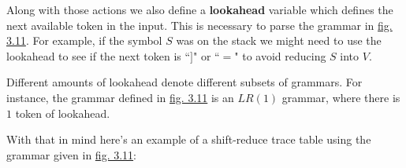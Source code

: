 Along with those actions we also define a \textbf{lookahead} variable which defines the next available token in the input. This is necessary to parse the grammar in \hyperref[fig:3.11]{fig. 3.11}. For example, if the symbol $S$ was on the stack we might need to use the lookahead to see if the next token is ``$]$" or ``$=$" to avoid reducing $S$ into $V$.\textsuperscript{\cite{johnson_zelenski_2007}\cite{knuth_1965}}

Different amounts of lookahead denote different subsets of grammars. For instance, the grammar defined in \hyperref[fig:3.11]{fig. 3.11} is an $LR(1)$ grammar, where there is $1$ token of lookahead.

With that in mind here's an example of a shift-reduce trace table using the grammar given in \hyperref[fig:3.11]{fig. 3.11}:

